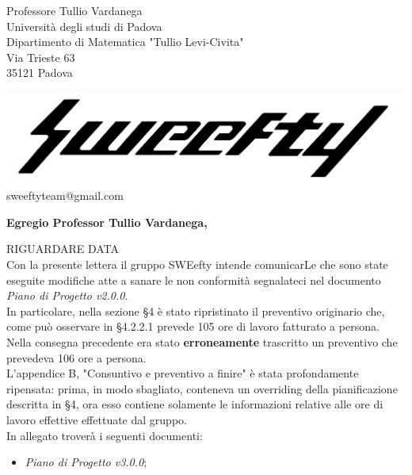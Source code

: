 \documentclass[12pt]{letter} %
\date{25/3/2018} %
\begin{document}



\begin{letter}{Professore Tullio Vardanega \\ Università degli studi di Padova \\ Dipartimento di Matematica "Tullio Levi-Civita" \\ Via Trieste 63 \\ 35121 Padova} %

\begin{center}
\includegraphics[width=\linewidth]{../../CommonImages/logo.jpg}
sweeftyteam@gmail.com
\end{center}

\opening{\textbf{Egregio Professor Tullio Vardanega,}}
\begin{addmargin}[2em]{2em}
  \hspace{1cm}
  RIGUARDARE DATA\\
  Con la presente lettera il gruppo SWEefty intende comunicarLe che sono state eseguite modifiche atte a sanare le non conformità segnalateci nel documento \emph{Piano di Progetto v2.0.0}.\\
  In particolare, nella sezione §4 è stato ripristinato il preventivo originario che, come può osservare in §4.2.2.1 prevede 105 ore di lavoro fatturato a persona. Nella consegna precedente era stato \textbf{erroneamente} trascritto un preventivo che prevedeva 106 ore a persona.\\
  L'appendice B, "Consuntivo e preventivo a finire" è stata profondamente ripensata: prima, in modo sbagliato, conteneva un overriding della pianificazione descritta in §4, ora esso contiene solamente le informazioni relative alle ore di lavoro effettive effettuate dal gruppo.
  \\
In allegato troverà i seguenti documenti:
\begin{itemize}
	\item \emph{Piano di Progetto v3.0.0};
\end{itemize}


\end{addmargin}
\end{letter}
\end{document}
